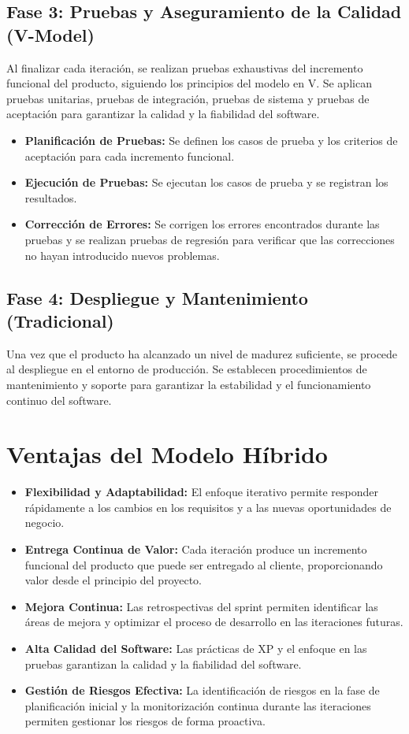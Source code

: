 \documentclass[12pt, spanish]{article}
\begin{document}
\subsection*{Fase 3: Pruebas y Aseguramiento de la Calidad (V-Model)}

Al finalizar cada iteración, se realizan pruebas exhaustivas del incremento funcional del producto, siguiendo los principios del modelo en V. Se aplican pruebas unitarias, pruebas de integración, pruebas de sistema y pruebas de aceptación para garantizar la calidad y la fiabilidad del software.

\begin{itemize}
    \item \textbf{Planificación de Pruebas:} Se definen los casos de prueba y los criterios de aceptación para cada incremento funcional.
    \item \textbf{Ejecución de Pruebas:} Se ejecutan los casos de prueba y se registran los resultados.
    \item \textbf{Corrección de Errores:} Se corrigen los errores encontrados durante las pruebas y se realizan pruebas de regresión para verificar que las correcciones no hayan introducido nuevos problemas.
\end{itemize}

\subsection*{Fase 4: Despliegue y Mantenimiento (Tradicional)}

Una vez que el producto ha alcanzado un nivel de madurez suficiente, se procede al despliegue en el entorno de producción. Se establecen procedimientos de mantenimiento y soporte para garantizar la estabilidad y el funcionamiento continuo del software.

\section*{Ventajas del Modelo Híbrido}

\begin{itemize}
    \item \textbf{Flexibilidad y Adaptabilidad:} El enfoque iterativo permite responder rápidamente a los cambios en los requisitos y a las nuevas oportunidades de negocio.
    \item \textbf{Entrega Continua de Valor:} Cada iteración produce un incremento funcional del producto que puede ser entregado al cliente, proporcionando valor desde el principio del proyecto.
    \item \textbf{Mejora Continua:} Las retrospectivas del sprint permiten identificar las áreas de mejora y optimizar el proceso de desarrollo en las iteraciones futuras.
    \item \textbf{Alta Calidad del Software:} Las prácticas de XP y el enfoque en las pruebas garantizan la calidad y la fiabilidad del software.
    \item \textbf{Gestión de Riesgos Efectiva:} La identificación de riesgos en la fase de planificación inicial y la monitorización continua durante las iteraciones permiten gestionar los riesgos de forma proactiva.
\end{itemize}
\end{document}
